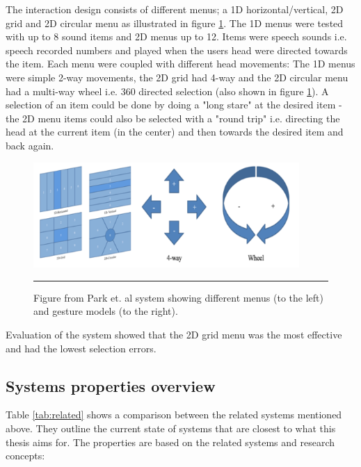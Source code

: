 The interaction design consists of different menus; a 1D horizontal/vertical, 2D grid and 2D circular menu as illustrated in figure \ref{fig:park-menus}. The 1D menus were tested with up to 8 sound items and 2D menus up to 12. Items were speech sounds i.e. speech recorded numbers and played when the users head were directed towards the item. Each menu were coupled with different head movements: The 1D menus were simple 2-way movements, the 2D grid had 4-way and the 2D circular menu had a multi-way wheel i.e. 360 directed selection (also shown in figure \ref{fig:park-menus}). A selection of an item could be done by doing a "long stare" at the desired item - the 2D menu items could also be selected with a "round trip" i.e. directing the head at the current item (in the center) and then towards the desired item and back again.

\begin{figure}[t]
	\centering
		\includegraphics[width=0.9\textwidth,height=\textheight,keepaspectratio]{./Figures/park-menus.png}
		\rule{35em}{0.5pt}
	\caption[Park menus]{Figure from Park et. al \cite{park_gaze-directed_2011} system showing different menus (to the left) and gesture models (to the right).}
	\label{fig:park-menus}
\end{figure}

Evaluation of the system showed that the 2D grid menu was the most effective and had the lowest selection errors.

\subsection{Systems properties overview}
Table \ref{tab:related} shows a comparison between the related systems mentioned above. They outline the current state of systems that are closest to what this thesis aims for. The properties are based on the related systems and research concepts:

